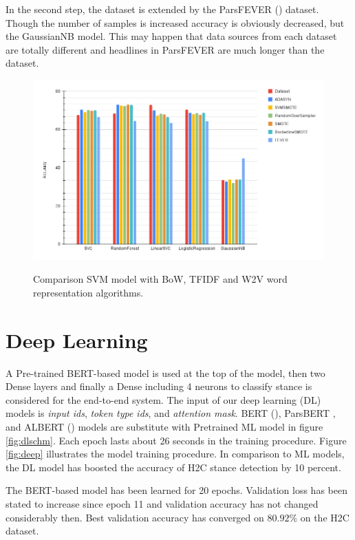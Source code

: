 In the second step, the dataset is extended by the ParsFEVER (\cite{parsfever}) dataset. Though the number of samples is increased accuracy is obviously decreased, but the GaussianNB model. This may happen that data sources from each dataset are totally different and headlines in ParsFEVER are much longer than the \cite{stance_persian} dataset.
\begin{figure}%
	\centering
	{\includegraphics[width=14.5cm]{statistics/balancing.png} }
	\caption{Comparison \ac{SVM} model with \ac{BoW}, \ac{TFIDF} and \ac{W2V} word representation algorithms.}%
	\label{fig:balanc}%
\end{figure}

\section{Deep Learning}

\label{sec:dl}
A Pre-trained \ac{BERT}-based model is used at the top of the model, then two Dense layers and finally a Dense including 4 neurons to classify stance is considered for the end-to-end system. The input of our deep learning (\ac{DL}) models is \textit{input ids}, \textit{token type ids}, and \textit{attention mask}.
\ac{BERT} (\cite{bert}), \ac{ParsBERT} \cite{parsbert}, and \ac{ALBERT} (\cite{albert}) models are substitute with Pretrained ML model in figure \ref{fig:dlschm}. Each epoch lasts about 26 seconds in the training procedure. Figure \ref{fig:deep} illustrates the model training procedure. In comparison to \ac{ML} models, the \ac{DL} model has boosted the accuracy of \ac{H2C} stance detection by 10 percent. 

The \ac{BERT}-based model has been learned for 20 epochs. Validation loss has been stated to increase since epoch 11 and validation accuracy has not changed considerably then. Best validation accuracy has converged on $80.92\%$ on the \ac{H2C} dataset. 

